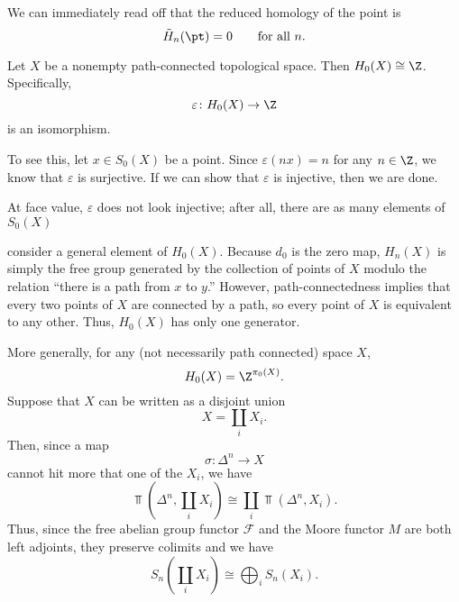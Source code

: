 \documentclass[main.tex]{subfiles}
\begin{document}
\begin{example}
 We can immediately read off that the reduced homology of the point is
  \begin{equation*}
    \tilde{H}_{n}(\pt) = 0\qquad \text{for all }n.
  \end{equation*}
\end{example}

\begin{example}
  Let $X$ be a nonempty path-connected topological space. Then $H_{0}(X) \cong \Z$. Specifically,
  \begin{equation*}
    \varepsilon\colon H_{0}(X) \to \Z
  \end{equation*}
  is an isomorphism.

  To see this, let $x \in S_{0}(X)$ be a point. Since $\varepsilon(nx) = n$ for any $n \in \Z$, we know that $\varepsilon$ is surjective. If we can show that $\varepsilon$ is injective, then we are done.

  At face value, $\varepsilon$ does not look injective; after all, there are as many elements of $S_{0}(X)$

  consider a general element of $H_{0}(X)$. Because $d_{0}$ is the zero map, $H_{n}(X)$ is simply the free group generated by the collection of points of $X$ modulo the relation ``there is a path from $x$ to $y$.'' However, path-connectedness implies that every two points of $X$ are connected by a path, so every point of $X$ is equivalent to any other. Thus, $H_{0}(X)$ has only one generator.
\end{example}

\begin{example}
  More generally, for any (not necessarily path connected) space $X$,
  \begin{equation*}
    H_{0}(X) = \Z^{\pi_{0}(X)}.
  \end{equation*}
  Suppose that $X$ can be written as a disjoint union
  \begin{equation*}
    X = \coprod_{i} X_{i}.
  \end{equation*}
  Then, since a map
  \begin{equation*}
    \sigma\colon \Delta^{n} \to X
  \end{equation*}
  cannot hit more that one of the $X_{i}$, we have
  \begin{equation*}
    \Top\left(\Delta^{n}, \coprod_{i} X_{i}\right) \cong \coprod_{i} \Top(\Delta^{n}, X_{i}).
  \end{equation*}
  Thus, since the free abelian group functor $\mathcal{F}$ and the Moore functor $M$ are both left adjoints, they preserve colimits and we have
  \begin{equation*}
    S_{n}\left(\coprod_{i} X_{i}\right) \cong \bigoplus_{i} S_{n}(X_{i}).
  \end{equation*}
\end{example}
\end{document}
